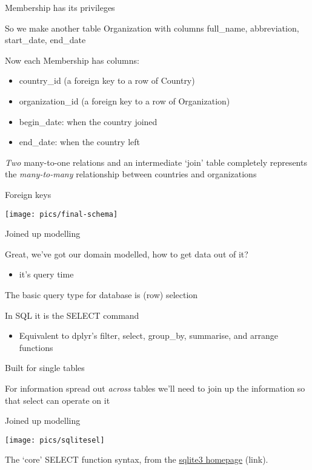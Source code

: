 \documentclass{hertieteaching}
\begin{document}
\begin{frame}{Membership has its privileges}

So we make another table \textsf{Organization} with columns 
\textsf{full\_name}, \textsf{abbreviation}, \textsf{start\_date}, \textsf{end\_date} 

Now each \textsf{Membership} has columns:
\begin{itemize}
  \item \textsf{country\_id} (a foreign key to a row of \textsf{Country})
  \item \textsf{organization\_id} (a foreign key to a row of \textsf{Organization})
  \item \textsf{begin\_date}: when the country joined
  \item \textsf{end\_date}: when the country left
\end{itemize}

\textit{Two} many-to-one relations and an intermediate `join' table completely represents the \textit{many-to-many} relationship between countries and organizations

\end{frame}

\begin{frame}{Foreign keys}
\medskip
\centerline{\texttt{[image: pics/final-schema]}}  
\end{frame}

\begin{frame}{Joined up modelling}

Great, we've got our domain modelled, how to get data out of it?
\begin{itemize}
  \item it's query time
\end{itemize}

\medskip
The basic query type for database is (row) selection

In \textsf{SQL} it is the \textsf{SELECT} command
\begin{itemize}
  \item Equivalent to \textsf{dplyr}'s \textsf{filter},  \textsf{select}, \textsf{group\_by}, \textsf{summarise}, and \textsf{arrange}  functions
\end{itemize}
Built for single tables
	
For information spread out \textit{across} tables we'll need to join up the information so that select can operate on it

\end{frame}
\begin{frame}{Joined up modelling}

\centerline{\texttt{[image: pics/sqlitesel]}}
  
The `core' \textsf{SELECT} function syntax, from the \href{https://sqlite.org/lang_select.html}{sqlite3 homepage} (link).

\end{frame}
\end{document}
